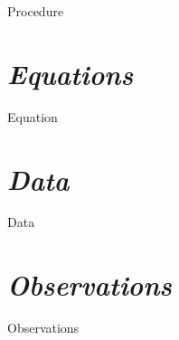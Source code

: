 \documentclass[12pt, a4paper]{article}
\begin{document}
        {Procedure}
        
        
        
\section{\textit{Equations}}
        
        {Equation}

\section{\textit{Data}}

	  {Data}      
        
        
        
        
        
        
        
\section{\textit{Observations}}
        
        {Observations}
        
        
\end{document}
